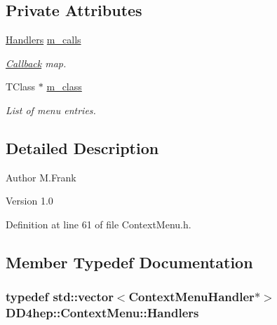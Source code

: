 \subsection*{Private Attributes}
\begin{DoxyCompactItemize}
\item 
\hyperlink{class_d_d4hep_1_1_context_menu_adafcfb2730659701df2a5364333ed386}{Handlers} \hyperlink{class_d_d4hep_1_1_context_menu_a4434fe38593c7eb73a8543cf1f8258ed}{m\_\-calls}
\begin{DoxyCompactList}\small\item\em \hyperlink{class_d_d4hep_1_1_callback}{Callback} map. \item\end{DoxyCompactList}\item 
TClass $\ast$ \hyperlink{class_d_d4hep_1_1_context_menu_ad9be22966c34ce07b6e83b2195bddad1}{m\_\-class}
\begin{DoxyCompactList}\small\item\em List of menu entries. \item\end{DoxyCompactList}\end{DoxyCompactItemize}


\subsection{Detailed Description}
\begin{DoxyAuthor}{Author}
M.Frank 
\end{DoxyAuthor}
\begin{DoxyVersion}{Version}
1.0 
\end{DoxyVersion}


Definition at line 61 of file ContextMenu.h.

\subsection{Member Typedef Documentation}
\hypertarget{class_d_d4hep_1_1_context_menu_adafcfb2730659701df2a5364333ed386}{
\subsubsection[{Handlers}]{\setlength{\rightskip}{0pt plus 5cm}typedef std::vector$<${\bf ContextMenuHandler}$\ast$$>$ {\bf DD4hep::ContextMenu::Handlers}}}
\label{class_d_d4hep_1_1_context_menu_adafcfb2730659701df2a5364333ed386}


